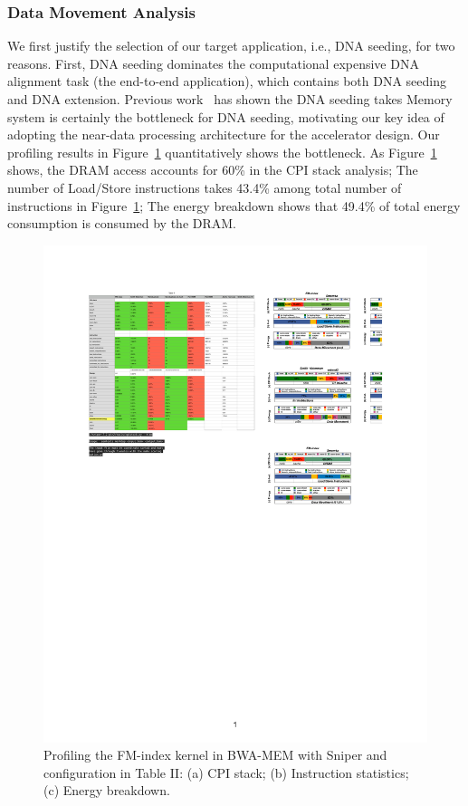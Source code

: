 \documentclass[9pt,conference]{IEEEtran}
\begin{document}
\subsubsection{Data Movement Analysis}
We first justify the selection of our target application, i.e., DNA seeding, for two reasons. First, DNA seeding dominates the computational expensive DNA alignment task (the end-to-end application), which contains both DNA seeding and DNA extension. Previous work~\cite{yuanrong} has shown the DNA seeding takes Memory system is certainly the bottleneck for DNA seeding, motivating our key idea of adopting the near-data processing architecture for the accelerator design. Our profiling results in Figure~\ref{fig:data-fm} quantitatively shows the bottleneck. As Figure~\ref{fig:data-fm} shows, the DRAM access accounts for 60\% in the CPI stack analysis; The number of Load/Store instructions takes 43.4\% among total number of instructions in Figure~\ref{fig:data-fm}; The energy breakdown shows that 49.4\% of total energy consumption is consumed by the DRAM.
\begin{figure}[htbp]
\centering
\includegraphics[scale=0.44]{Conference-LaTeX-template_10-17-19/fig/data-fm.pdf}
\caption{Profiling the FM-index kernel in BWA-MEM with Sniper and configuration in Table II: (a) CPI stack; (b) Instruction statistics; (c) Energy breakdown.}
\label{fig:data-fm}
\end{figure}
\end{document}
